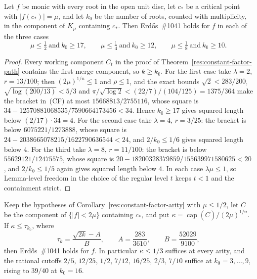 \begin{corollary}
\label{res:constant-factor-arity}
Let $f$ be monic with every root in the open unit disc, let $c_*$ be a
critical point with $|f(c_*)|=\mu$, and let $k_0$ be the number of roots,
counted with multiplicity, in the component of $K_\mu$ containing $c_*$.
Then Erd\H{o}s~\#1041 holds for $f$ in each of the three cases
\[
 \mu\le\tfrac12\ \text{and}\ k_0\ge17,\qquad
 \mu\le\tfrac14\ \text{and}\ k_0\ge12,\qquad
 \mu\le\tfrac18\ \text{and}\ k_0\ge10 .
\]
\end{corollary}

\begin{proof}
Every working component $C_t$ in the proof of
Theorem~\ref{res:constant-factor-path} contains the first-merge component, so
$k\ge k_0$.  For the first case take $\lambda=2$, $r=13/100$; then
$(2\mu)^{1/n}\le1$ and $\rho\le1$, and the exact bounds
$\sqrt2<283/200$, $\sqrt{\log(200/13)}<5/3$ and
$\pi/\sqrt{\log2}<(22/7)/(104/125)=1375/364$ make the bracket in~(CF) at most
$15668813/2755116$, whose square is $34-12570881068535/7590664173456<34$.
Hence $k_0\ge17$ gives squared length below $(2/17)\cdot34=4$.  For the second
case take $\lambda=4$, $r=3/25$: the bracket is below $6075221/1273888$, whose
square is $24-2038665078215/1622790636544<24$, and $2/k_0\le1/6$ gives squared
length below $4$.  For the third take $\lambda=8$, $r=11/100$: the bracket is
below $55629121/12475575$, whose square is
$20-18200328379859/155639971580625<20$, and $2/k_0\le1/5$ again gives squared
length below $4$.  In each case $\lambda\mu\le1$, so Lemma-level freedom in
the choice of the regular level $t$ keeps $t<1$ and the containment strict.
\end{proof}

\begin{corollary}
\label{res:constant-factor-capacity}
Keep the hypotheses of Corollary~\ref{res:constant-factor-arity} with
$\mu\le1/2$, let $C$ be the component of $\{|f|<2\mu\}$ containing $c_*$, and
put $\kappa=\operatorname{cap}(\overline C)/(2\mu)^{1/n}$.  If
$\kappa\le\tau_{k_0}$, where
\[
 \tau_k=\frac{\sqrt{2k}-A}{B},\qquad
 A=\frac{283}{3610},\qquad B=\frac{52029}{9100},
\]
then Erd\H{o}s~\#1041 holds for $f$.  In particular $\kappa\le1/3$ suffices at
every arity, and the rational cutoffs
$2/5,\,12/25,\,1/2,\,7/12,\,16/25,\,2/3,\,7/10$ suffice at
$k_0=3,\ldots,9$, rising to $39/40$ at $k_0=16$.
\end{corollary}

